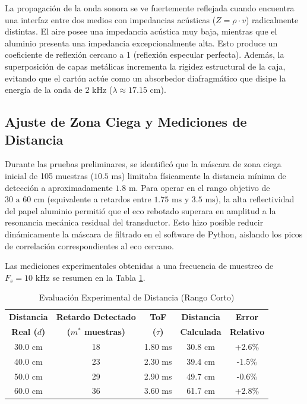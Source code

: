 \documentclass[conference]{IEEEtran}
\begin{document}
La propagación de la onda sonora se ve fuertemente reflejada cuando encuentra una interfaz entre dos medios con impedancias acústicas ($Z = \rho \cdot v$) radicalmente distintas. El aire posee una impedancia acústica muy baja, mientras que el aluminio presenta una impedancia excepcionalmente alta. Esto produce un coeficiente de reflexión cercano a 1 (reflexión especular perfecta). Además, la superposición de capas metálicas incrementa la rigidez estructural de la caja, evitando que el cartón actúe como un absorbedor diafragmático que disipe la energía de la onda de $2\text{ kHz}$ ($\lambda \approx 17.15\text{ cm}$).

\subsection{Ajuste de Zona Ciega y Mediciones de Distancia}
Durante las pruebas preliminares, se identificó que la máscara de zona ciega inicial de 105 muestras ($10.5\text{ ms}$) limitaba físicamente la distancia mínima de detección a aproximadamente $1.8\text{ m}$. Para operar en el rango objetivo de $30\text{ a }60\text{ cm}$ (equivalente a retardos entre $1.75\text{ ms}$ y $3.5\text{ ms}$), la alta reflectividad del papel aluminio permitió que el eco rebotado superara en amplitud a la resonancia mecánica residual del transductor. Esto hizo posible reducir dinámicamente la máscara de filtrado en el software de Python, aislando los picos de correlación correspondientes al eco cercano.

Las mediciones experimentales obtenidas a una frecuencia de muestreo de $F_s = 10\text{ kHz}$ se resumen en la Tabla \ref{tab:mediciones}.

\begin{table}[htbp]
\caption{Evaluación Experimental de Distancia (Rango Corto)}
\begin{center}
\begin{tabular}{|c|c|c|c|c|}
\hline
\textbf{Distancia} & \textbf{Retardo Detectado} & \textbf{ToF} & \textbf{Distancia} & \textbf{Error} \\
\textbf{Real ($d$)} & \textbf{($m^*$ muestras)} & \textbf{($\tau$)} & \textbf{Calculada} & \textbf{Relativo} \\
\hline
30.0 cm & 18 & 1.80 ms & 30.8 cm & +2.6\% \\
\hline
40.0 cm & 23 & 2.30 ms & 39.4 cm & -1.5\% \\
\hline
50.0 cm & 29 & 2.90 ms & 49.7 cm & -0.6\% \\
\hline
60.0 cm & 36 & 3.60 ms & 61.7 cm & +2.8\% \\
\hline
\end{tabular}
\label{tab:mediciones}
\end{center}
\end{table}
\end{document}
